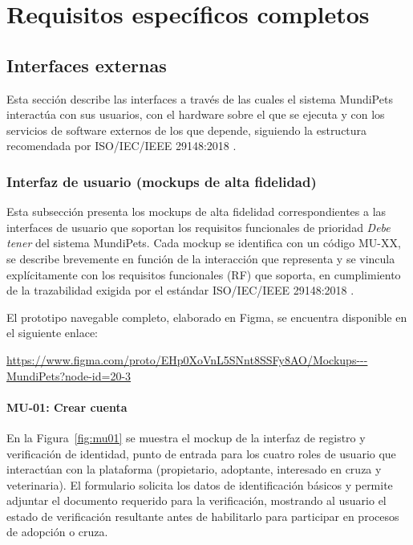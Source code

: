 \documentclass[journal,onecolumn]{IEEEtran}
\begin{document}
	\section{Requisitos específicos completos}
	\label{sec:requisitos}
	
	\subsection{Interfaces externas}
	\label{sec:interfaces}
	
	Esta sección describe las interfaces a través de las cuales el sistema
	MundiPets interactúa con sus usuarios, con el hardware sobre el que se
	ejecuta y con los servicios de software externos de los que depende,
	siguiendo la estructura recomendada por ISO/IEC/IEEE 29148:2018
	\cite{iso29148}.
	
	\subsubsection{Interfaz de usuario (mockups de alta fidelidad)}
	\label{sec:mockups}
	
	Esta subsección presenta los mockups de alta fidelidad correspondientes a
	las interfaces de usuario que soportan los requisitos funcionales de
	prioridad \emph{Debe tener} del sistema MundiPets. Cada mockup se identifica
	con un código MU-XX, se describe brevemente en función de la interacción que
	representa y se vincula explícitamente con los requisitos funcionales (RF)
	que soporta, en cumplimiento de la trazabilidad exigida por el estándar
	ISO/IEC/IEEE 29148:2018 \cite{iso29148}.
	
	El prototipo navegable completo, elaborado en Figma, se encuentra disponible
	en el siguiente enlace:
	
	\begin{center}
		\small\url{https://www.figma.com/proto/EHp0XoVnL5SNnt8SSFy8AO/Mockups---MundiPets?node-id=20-3}
	\end{center}
	
	\paragraph{MU-01: Crear cuenta}
	
	En la Figura~\ref{fig:mu01} se muestra el mockup de la interfaz de registro y
	verificación de identidad, punto de entrada para los cuatro roles de usuario
	que interactúan con la plataforma (propietario, adoptante, interesado en
	cruza y veterinaria). El formulario solicita los datos de identificación
	básicos y permite adjuntar el documento requerido para la verificación,
	mostrando al usuario el estado de verificación resultante antes de
	habilitarlo para participar en procesos de adopción o cruza.
	
\end{document}
